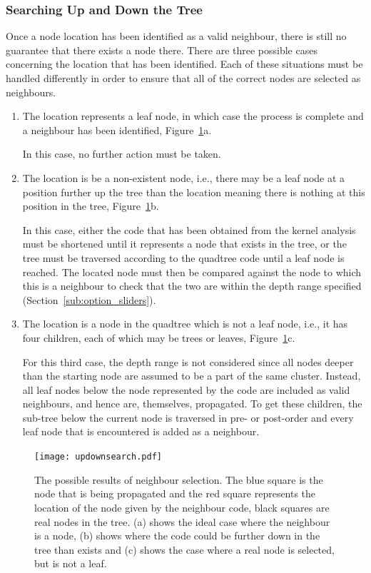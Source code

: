 \subsubsection*{Searching Up and Down the Tree}
\label{ssub:Searching Up and Down the Tree}

Once a node location has been identified as a valid neighbour, there is still
no guarantee that there exists a node there. There are three possible cases
concerning the location that has been identified. Each of these situations must
be handled differently in order to ensure that all of the correct nodes are
selected as neighbours.

\begin{enumerate}
	\item The location represents a leaf node, in which case the process is
		complete and a neighbour has been identified,
		Figure~\ref{fig:updownsearch}a.

		In this case, no further action must be taken.

	\item The location is be a non-existent node, i.e., there may be a leaf
		node at a position further up the tree than the location meaning there
		is nothing at this position in the tree,
		Figure~\ref{fig:updownsearch}b.

		In this case, either the code that has been obtained from the kernel
		analysis must be shortened until it represents a node that exists in
		the tree, or the tree must be traversed according to the quadtree code
		until a leaf node is reached. The located node must then be compared
		against the node to which this is a neighbour to check that the two are
		within the depth range specified (Section~\ref{sub:option_sliders}).

	\item The location is a node in the quadtree which is not a leaf node,
		i.e., it has four children, each of which may be trees or leaves,
		Figure~\ref{fig:updownsearch}c.

		For this third case, the depth range is not considered since all nodes
		deeper than the starting node are assumed to be a part of the same
		cluster. Instead, all leaf nodes below the node represented by the code
		are included as valid neighbours, and hence are, themselves,
		propagated. To get these children, the sub-tree below the current node
		is traversed in pre- or post-order and every leaf node that is
		encountered is added as a neighbour.

\end{enumerate}

\begin{figure}[tbhp]
	\centering
	\texttt{[image: updownsearch.pdf]}
	\caption[Possible results of neighbour selection.]{The possible results of
		neighbour selection. The blue square is the node that is being
		propagated and the red square represents the location of the node given
		by the neighbour code, black squares are real nodes in the tree. (a)
		shows the ideal case where the neighbour is a node, (b) shows where the
		code could be further down in the tree than exists and (c) shows the
		case where a real node is selected, but is not a leaf.}\label{fig:updownsearch}
\end{figure}
